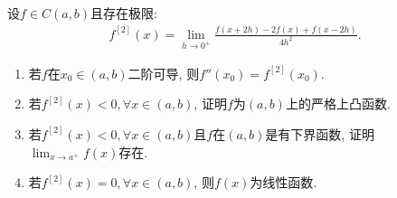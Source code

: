 \documentclass[../../main.tex]{subfiles}
\begin{document}
\begin{example}
设$f \in C(a,b)$且存在极限:
\begin{align}
f^{[2]}(x) = \lim_{h \to 0^+} \frac{f(x+2h) - 2f(x) + f(x-2h)}{4h^2}. \label{eq:13.109}
\end{align}
\begin{enumerate}
\item 若$f$在$x_0 \in (a,b)$二阶可导, 则$f''(x_0) = f^{[2]}(x_0)$.

\item 若$f^{[2]}(x) < 0, \forall x \in (a,b)$, 证明$f$为$(a,b)$上的严格上凸函数.

\item 若$f^{[2]}(x) < 0, \forall x \in (a,b)$且$f$在$(a,b)$是有下界函数, 证明$\lim_{x \to a^+} f(x)$存在.

\item 若$f^{[2]}(x) = 0, \forall x \in (a,b)$, 则$f(x)$为线性函数.
\end{enumerate}
\end{example}
\end{document}
